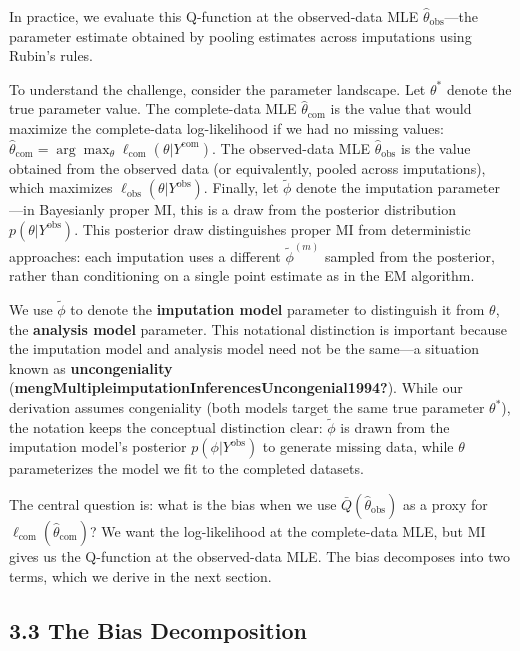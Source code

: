 \documentclass[
]{article}
\begin{document}
In practice, we evaluate this Q-function at the observed-data MLE
\(\hat{\theta}_{\text{obs}}\)---the parameter estimate obtained by
pooling estimates across imputations using Rubin's rules.

To understand the challenge, consider the parameter landscape. Let
\(\theta^*\) denote the true parameter value. The complete-data MLE
\(\hat{\theta}_{\text{com}}\) is the value that would maximize the
complete-data log-likelihood if we had no missing values:
\(\hat{\theta}_{\text{com}} = \arg\max_\theta \ell_{\text{com}}(\theta | Y^{\text{com}})\).
The observed-data MLE \(\hat{\theta}_{\text{obs}}\) is the value
obtained from the observed data (or equivalently, pooled across
imputations), which maximizes
\(\ell_{\text{obs}}(\theta | Y^{\text{obs}})\). Finally, let
\(\tilde{\phi}\) denote the imputation parameter---in Bayesianly proper
MI, this is a draw from the posterior distribution
\(p(\theta|Y^{\text{obs}})\). This posterior draw distinguishes proper
MI from deterministic approaches: each imputation uses a different
\(\tilde{\phi}^{(m)}\) sampled from the posterior, rather than
conditioning on a single point estimate as in the EM algorithm.

We use \(\tilde{\phi}\) to denote the \textbf{imputation model}
parameter to distinguish it from \(\theta\), the \textbf{analysis model}
parameter. This notational distinction is important because the
imputation model and analysis model need not be the same---a situation
known as \textbf{uncongeniality}
(\textbf{mengMultipleimputationInferencesUncongenial1994?}). While our
derivation assumes congeniality (both models target the same true
parameter \(\theta^*\)), the notation keeps the conceptual distinction
clear: \(\tilde{\phi}\) is drawn from the imputation model's posterior
\(p(\phi|Y^{\text{obs}})\) to generate missing data, while \(\theta\)
parameterizes the model we fit to the completed datasets.

The central question is: what is the bias when we use
\(\bar{Q}(\hat{\theta}_{\text{obs}})\) as a proxy for
\(\ell_{\text{com}}(\hat{\theta}_{\text{com}})\)? We want the
log-likelihood at the complete-data MLE, but MI gives us the Q-function
at the observed-data MLE. The bias decomposes into two terms, which we
derive in the next section.

\subsection{3.3 The Bias Decomposition}\label{the-bias-decomposition}
\end{document}
